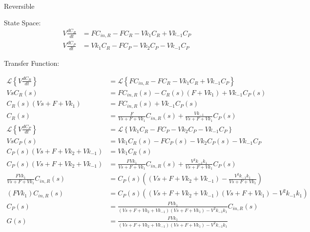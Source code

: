 \documentclass[12pt]{article}
\begin{document}
\begin{enumerate}
\begin{enumerate}
    Reversible

    State Space:
    \begin{align*}
        V \frac{dC_R}{dt} &= F C_{in,R} - F C_R - V k_1 C_R + V k_{-1} C_P \\
        V \frac{dC_P}{dt} &= V k_1 C_R - F C_P - V k_2 C_P - V k_{-1} C_P
    \end{align*}

    Transfer Function:

    \begin{align*}
        \mathcal{L}\left\{V \frac{dC_R}{dt}\right\} &= \mathcal{L}\left\{F C_{in,R} - F C_R - V k_1 C_R + V k_{-1} C_P\right\} \\
        V s C_R(s) &= F C_{in,R}(s) - C_R(s) (F + V k_1) + V k_{-1} C_P(s) \\
        C_R(s) (V s + F + V k_1) &= F C_{in,R}(s) + V k_{-1} C_P(s) \\
        C_R(s) &= \frac{F}{V s + F + V k_1} C_{in,R}(s) + \frac{V k_{-1}}{V s + F + V k_1} C_P(s) \\
        \mathcal{L}\left\{V \frac{dC_P}{dt}\right\} &= \mathcal{L}\left\{V k_1 C_R - F C_P - V k_2 C_P - V k_{-1} C_P\right\} \\
        V s C_P(s) &= V k_1 C_R(s) - F C_P(s) - V k_2 C_P(s) - V k_{-1} C_P \\
        C_P(s) (V s + F + V k_2 + V k_{-1}) &= V k_1 C_R(s) \\
        C_P(s) (V s + F + V k_2 + V k_{-1}) &= \frac{F V k_1}{V s + F + V k_1} C_{in,R}(s) + \frac{V^2 k_{-1} k_1}{V s + F + V k_1} C_P(s) \\
        \frac{F V k_1}{V s + F + V k_1} C_{in,R}(s) &= C_P(s) \left((V s + F + V k_2 + V k_{-1}) - \frac{V^2 k_{-1} k_1}{V s + F + V k_1}\right) \\
        (F V k_1) C_{in,R}(s) &= C_P(s) \left((V s + F + V k_2 + V k_{-1}) (V s + F + V k_1) - V^2 k_{-1} k_1\right) \\
        C_P(s) &= \frac{F V k_1}{(V s + F + V k_2 + V k_{-1}) (V s + F + V k_1) - V^2 k_{-1} k_1} C_{in,R}(s) \\
        G(s) &= \frac{F V k_1}{(V s + F + V k_2 + V k_{-1}) (V s + F + V k_1) - V^2 k_{-1} k_1} \\
    \end{align*}


\end{enumerate}
\end{enumerate}
\end{document}
